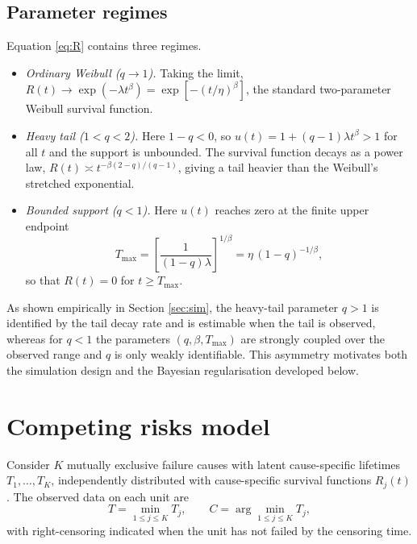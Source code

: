 \documentclass[ASNA,twocolumn]{USG}
\begin{document}
\subsection{Parameter regimes}
Equation \eqref{eq:R} contains three regimes.
\begin{itemize}
  \item \emph{Ordinary Weibull ($q\to1$).} Taking the limit,
  $R(t)\to\exp(-\lambda t^\beta)=\exp[-(t/\eta)^\beta]$, the standard
  two-parameter Weibull survival function.
  \item \emph{Heavy tail ($1<q<2$).} Here $1-q<0$, so $u(t)=1+(q-1)\lambda
  t^\beta>1$ for all $t$ and the support is unbounded. The survival function
  decays as a power law, $R(t)\asymp t^{-\beta(2-q)/(q-1)}$, giving a tail
  heavier than the Weibull's stretched exponential.
  \item \emph{Bounded support ($q<1$).} Here $u(t)$ reaches zero at the finite
  upper endpoint
  \begin{equation}\label{eq:Tmax}
  T_{\max} = \left[\frac{1}{(1-q)\lambda}\right]^{1/\beta}
           = \eta\,(1-q)^{-1/\beta},
  \end{equation}
  so that $R(t)=0$ for $t\ge T_{\max}$.
\end{itemize}

\begin{remark}
As shown empirically in Section \ref{sec:sim}, the heavy-tail parameter
$q>1$ is identified by the tail decay rate and is estimable when the tail is
observed, whereas for $q<1$ the parameters $(q,\beta,T_{\max})$ are strongly
coupled over the observed range and $q$ is only weakly identifiable. This
asymmetry motivates both the simulation design and the Bayesian
regularisation developed below.
\end{remark}

\section{Competing risks model}\label{sec:cr}

Consider $K$ mutually exclusive failure causes with latent cause-specific
lifetimes $T_1,\dots,T_K$, independently distributed with cause-specific
survival functions $R_j(t)$. The observed data on each unit are
\begin{equation}\label{eq:obs}
T = \min_{1\le j\le K} T_j, \qquad
C = \arg\min_{1\le j\le K} T_j,
\end{equation}
with right-censoring indicated when the unit has not failed by the
censoring time.
\end{document}
